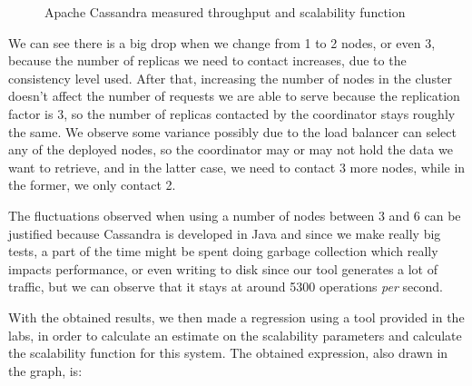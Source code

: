 \documentclass[runningheads]{llncs}
\begin{document}
\begin{figure}
    \begin{center}
    \end{center}
    \caption{Apache Cassandra measured throughput and scalability function}
\end{figure}

We can see there is a big drop when we change from 1 to 2 nodes, or even 3, because the number of replicas we need to contact increases, due to the consistency level used. After that, increasing the number of nodes in the cluster doesn't affect the number of requests we are able to serve because the replication factor is 3, so the number of replicas contacted by the coordinator stays roughly the same.
We observe some variance possibly due to the load balancer can select any of the deployed nodes, so the coordinator may or may not hold the data we want to retrieve, and in the latter case, we need to contact 3 more nodes, while in the former, we only contact 2.\par

The fluctuations observed when using a number of nodes between 3 and 6 can be justified because Cassandra is developed in Java and since we make really big tests, a part of the time might be spent doing garbage collection which really impacts performance, or even writing to disk since our tool generates a lot of traffic, but we can observe that it stays at around 5300 operations \textit{per} second. \par

With the obtained results, we then made a regression using a tool provided in the labs, in order to calculate an estimate on the scalability parameters and calculate the scalability function for this system. The obtained expression, also drawn in the graph, is:
\end{document}

